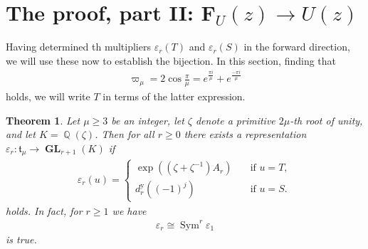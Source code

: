 \documentclass[11pt]{article}
\newtheorem{thm}{Theorem}
\DeclareMathOperator{\QQ}{\mathbb{Q}}
\DeclareMathOperator{\GL}{\mathbf{GL}}
\DeclareMathOperator{\Sym}{Sym}
\begin{document}
\section{The proof, part II: $ \mathbf{F}_U(z) \rightarrow U(z) $}
Having determined th multipliers $\varepsilon_r(T) $ and $ \varepsilon_r(S) $ in the forward direction, we will use these now to establish the bijection. In this section, finding that
    \begin{eqnarray*}
        \varpi_\mu = 2 \cos \frac{\pi}{\mu} =  e^{\frac{\pi i }{\mu}} + {e^{\frac{-\pi i }{\mu}}}
    \end{eqnarray*}
holds, we will write $ T $ in terms of the latter expression.

\begin{thm}
    Let $ \mu \geq 3 $ be an integer, let $\zeta$ denote a primitive $2\mu$-th root of unity, and let $ K =\QQ(\zeta)$. Then for all $r\geq 0$ there exists a representation $\varepsilon_r \colon \mathfrak{t}_\mu \to \GL_{r+1}(K) $    
    if
        \begin{eqnarray*}
            \varepsilon_r(u) = 
            \begin{cases}
                \exp((\zeta+\zeta^{-1})A_r) \quad & \text{if } u = T, \\
                d_r^{\text{y}}((-1)^j) & \text{if }u = S.
            \end{cases}
        \end{eqnarray*}
    holds. In fact, for $ r\geq 1 $ we have
        \begin{eqnarray*}
            \varepsilon_r \cong \Sym^{r}\varepsilon_1
        \end{eqnarray*}
    is true. 
\end{thm}
\end{document}
